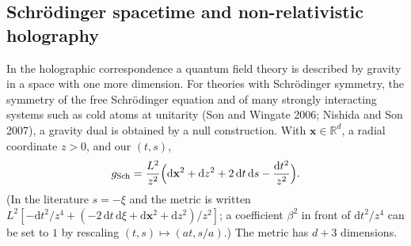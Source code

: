 \subsection{Schr\"odinger spacetime and non-relativistic holography}
\label{sec:nr-holography}

In the holographic correspondence a quantum field theory is described by gravity in
a space with one more dimension. For theories with Schr\"odinger symmetry, the
symmetry of the free Schr\"odinger equation and of many strongly interacting
systems such as cold atoms at unitarity (Son and Wingate 2006; Nishida and Son
2007), a gravity dual is obtained by a null construction. With
$\mathbf{x}\in\mathbb{R}^d$, a radial coordinate $z>0$, and our $(t,s)$,
\begin{equation}
  g_{\rm Sch}=\frac{L^2}{z^2}\Bigl(\mathrm{d}\mathbf{x}^2+\mathrm{d}z^2
  +2\,\mathrm{d}t\,\mathrm{d}s-\frac{\mathrm{d}t^2}{z^2}\Bigr).
  \label{nr:sch}
\end{equation}
(In the literature $s=-\xi$ and the metric is written
$L^2[-\mathrm{d}t^2/z^4+(-2\,\mathrm{d}t\,\mathrm{d}\xi+\mathrm{d}\mathbf{x}^2+\mathrm{d}z^2)/z^2]$; a
coefficient $\beta^2$ in front of $\mathrm{d}t^2/z^4$ can be set to $1$ by
rescaling $(t,s)\mapsto(at,s/a)$.) The metric has $d+3$ dimensions.

